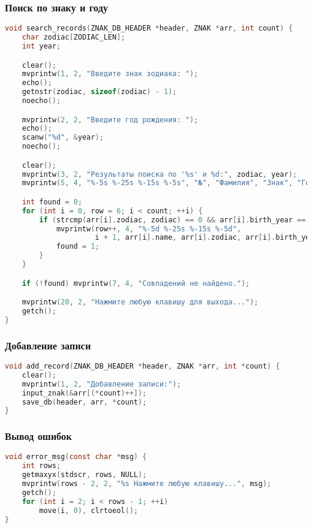 \subsubsection*{Поиск по знаку и году}
\begin{lstlisting}[language=C, caption=Функция search\_records]
void search_records(ZNAK_DB_HEADER *header, ZNAK *arr, int count) {
    char zodiac[ZODIAC_LEN];
    int year;

    clear();
    mvprintw(1, 2, "Введите знак зодиака: ");
    echo();
    getnstr(zodiac, sizeof(zodiac) - 1);
    noecho();

    mvprintw(2, 2, "Введите год рождения: ");
    echo();
    scanw("%d", &year);
    noecho();

    clear();
    mvprintw(3, 2, "Результаты поиска по '%s' и %d:", zodiac, year);
    mvprintw(5, 4, "%-5s %-25s %-15s %-5s", "№", "Фамилия", "Знак", "Год");

    int found = 0;
    for (int i = 0, row = 6; i < count; ++i) {
        if (strcmp(arr[i].zodiac, zodiac) == 0 && arr[i].birth_year == year) {
            mvprintw(row++, 4, "%-5d %-25s %-15s %-5d",
                     i + 1, arr[i].name, arr[i].zodiac, arr[i].birth_year);
            found = 1;
        }
    }

    if (!found) mvprintw(7, 4, "Совпадений не найдено.");

    mvprintw(20, 2, "Нажмите любую клавишу для выхода...");
    getch();
}
\end{lstlisting}

\subsubsection*{Добавление записи}
\begin{lstlisting}[language=C, caption=Функция add\_record]
void add_record(ZNAK_DB_HEADER *header, ZNAK *arr, int *count) {
    clear();
    mvprintw(1, 2, "Добавление записи:");
    input_znak(&arr[(*count)++]);
    save_db(header, arr, *count);
}
\end{lstlisting}

\subsubsection*{Вывод ошибок}
\begin{lstlisting}[language=C, caption=Функция error\_msg]
void error_msg(const char *msg) {
    int rows;
    getmaxyx(stdscr, rows, NULL);
    mvprintw(rows - 2, 2, "%s Нажмите любую клавишу...", msg);
    getch();
    for (int i = 2; i < rows - 1; ++i)
        move(i, 0), clrtoeol();
}
\end{lstlisting}

